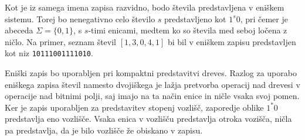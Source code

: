 Kot je iz samega imena zapisa razvidno, bodo števila predstavljena v eniškem sistemu. Torej bo nenegativno celo število $s$ predstavljeno kot $1^s0$, pri čemer je abeceda $\Sigma=\{0,1\}$, s $s$-timi enicami, medtem ko so števila med seboj ločena z ničlo. Na primer, seznam števil $[1,3,0,4,1]$ bi bil v eniškem zapisu predstavljen kot niz \texttt{10111001111010}.

Eniški zapis bo uporabljen pri kompaktni predstavitvi dreves. Razlog za uporabo eniškega zapisa števil namesto  dvojiškega je lažja pretvorba operacij nad drevesi v operacije nad bitnimi polji, saj imajo na ta način enice in ničle vsaka svoj pomen. Ker je zapis uporabljen za predstavitev stopenj vozlišč, zaporedje oblike $1^*0$ predstavlja eno vozlišče. Vsaka enica v vozlišču predstavlja otroka vozišča, ničla pa predstavlja, da je bilo vozlišče že obiskano v zapisu.

